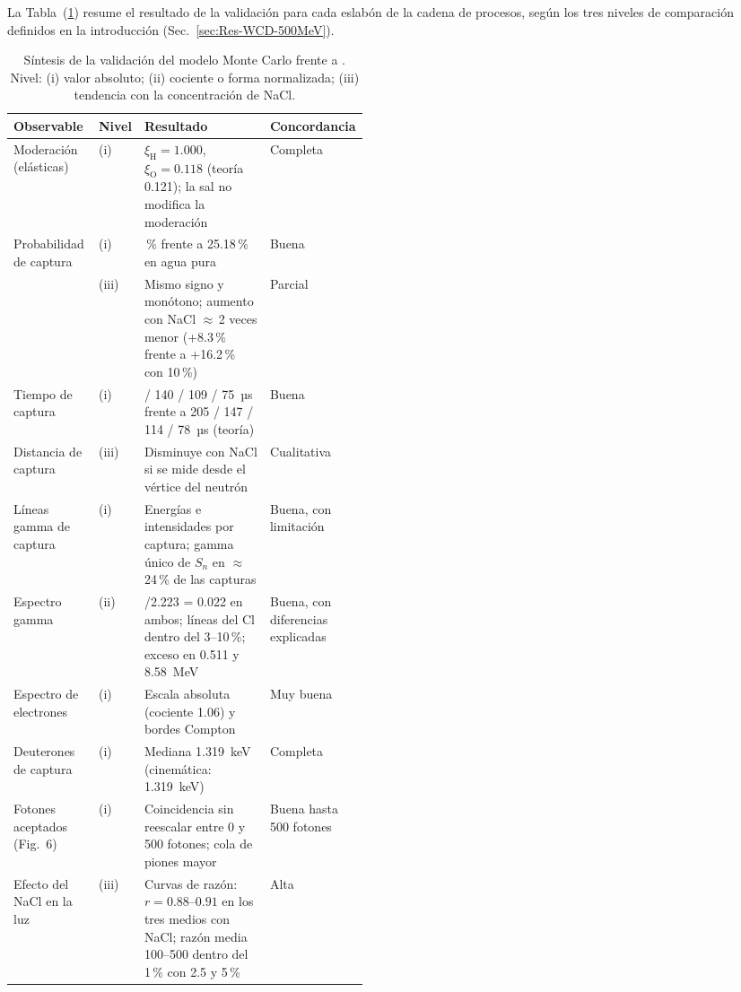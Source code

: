 La Tabla~(\ref{tab:sintesis-validacion}) resume el resultado de la validación para cada eslabón de la cadena de procesos, según los tres niveles de comparación definidos en la introducción (Sec.~\ref{sec:Res-WCD-500MeV}).

\begin{table}[!htbp]
	\centering
	\small
	\captionsetup{width=\linewidth,justification=justified,singlelinecheck=false}
	\caption[Síntesis de la validación del modelo frente a Sidelnik et al. (2020)]{Síntesis de la validación del modelo Monte Carlo frente a \protect\citet{Sidelnik2020}. Nivel: (i) valor absoluto; (ii) cociente o forma normalizada; (iii) tendencia con la concentración de NaCl.}
	\label{tab:sintesis-validacion}
	\renewcommand{\arraystretch}{1.2}
	\begin{tabularx}{\linewidth}{>{\raggedright\arraybackslash}p{0.24\linewidth} >{\centering\arraybackslash}p{0.06\linewidth} >{\raggedright\arraybackslash}X >{\centering\arraybackslash}p{0.16\linewidth}}
		\toprule
		\textbf{Observable} & \textbf{Nivel} & \textbf{Resultado} & \textbf{Concordancia} \\
		\midrule
		Moderación (elásticas) & (i) & $\xi_{\mathrm{H}}=1.000$, $\xi_{\mathrm{O}}=0.118$ (teoría 0.121); la sal no modifica la moderación & Completa \\
		Probabilidad de captura & (i) & 24.08\,\% frente a 25.18\,\% en agua pura & Buena \\
		 & (iii) & Mismo signo y monótono; aumento con NaCl $\approx$\,2 veces menor (+8.3\,\% frente a +16.2\,\% con 10\,\%) & Parcial \\
		Tiempo de captura & (i) & 192 / 140 / 109 / 75~µs frente a 205 / 147 / 114 / 78~µs (teoría) & Buena \\
		Distancia de captura & (iii) & Disminuye con NaCl si se mide desde el vértice del neutrón & Cualitativa \\
		Líneas gamma de captura & (i) & Energías e intensidades por captura; gamma único de $S_n$ en $\approx$\,24\,\% de las capturas & Buena, con limitación \\
		Espectro gamma & (ii) & 6.13/2.223 = 0.022 en ambos; líneas del Cl dentro del 3--10\,\%; exceso en 0.511 y 8.58~MeV & Buena, con diferencias explicadas \\
		Espectro de electrones & (i) & Escala absoluta (cociente 1.06) y bordes Compton & Muy buena \\
		Deuterones de captura & (i) & Mediana 1.319~keV (cinemática: 1.319~keV) & Completa \\
		Fotones aceptados (Fig.~6) & (i) & Coincidencia sin reescalar entre 0 y 500 fotones; cola de piones mayor & Buena hasta 500 fotones \\
		Efecto del NaCl en la luz & (iii) & Curvas de razón: $r=0.88$--$0.91$ en los tres medios con NaCl; razón media 100--500 dentro del 1\,\% con 2.5 y 5\,\% & Alta \\
		\bottomrule
	\end{tabularx}
\end{table}


